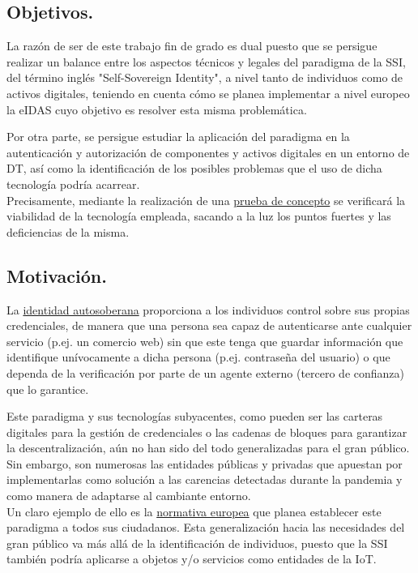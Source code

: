 \documentclass[../main.tex]{subfiles}
\begin{document}
\subsection{Objetivos.}
La razón de ser de este trabajo fin de grado es dual puesto que se persigue realizar un balance entre los aspectos técnicos y legales del paradigma de la \acrfull{SSI}, del término inglés "Self-Sovereign Identity", a nivel tanto de individuos como de activos digitales, teniendo en cuenta cómo se planea implementar a nivel europeo la \acrfull{eIDAS} cuyo objetivo es resolver esta misma problemática. 

Por otra parte, se persigue estudiar la aplicación del paradigma en la autenticación y autorización de componentes y activos digitales en un entorno de \acrfull{DT}, así como la identificación de los posibles problemas que el uso de dicha tecnología podría acarrear. 
\\
Precisamente, mediante la realización de una \hyperref[Prueba de concepto]{prueba de concepto} se verificará la viabilidad de la tecnología empleada, sacando a la luz los puntos fuertes y las deficiencias de la misma.

\subsection{Motivación.}
La \hyperref[Identidad Autosoberana]{identidad autosoberana} proporciona a los individuos control sobre sus propias credenciales, de manera que una persona sea capaz de autenticarse ante cualquier servicio (p.ej. un comercio web) sin que este tenga que guardar información que identifique unívocamente a dicha persona (p.ej. contraseña del usuario) o que dependa de la verificación por parte de un agente externo (tercero de confianza) que lo garantice.

Este paradigma y sus tecnologías subyacentes, como pueden ser las carteras digitales para la gestión de credenciales o las cadenas
de bloques para garantizar la descentralización, aún no han sido del todo generalizadas para el gran público. Sin embargo, son numerosas las entidades públicas y privadas que apuestan por implementarlas como solución a las carencias detectadas durante la pandemia y como manera de adaptarse al cambiante entorno. 
\\
Un claro ejemplo de ello es la \hyperref[Identidad Digital Europea]{normativa europea} que planea establecer este paradigma a todos sus ciudadanos. Esta generalización hacia las necesidades del gran público va más allá de la identificación de individuos, puesto que la \acrshort{SSI} también podría aplicarse a objetos y/o servicios como entidades de la \acrfull{IoT}. 
\end{document}
